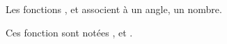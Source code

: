 Les fonctions ,  et 
associent à un angle, un nombre.\par\smallskip\noindent
Ces fonction sont notées ,  et .